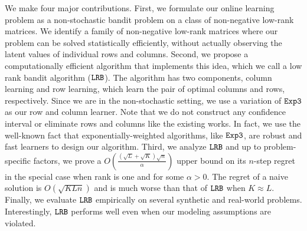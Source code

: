 

We make four major contributions. First, we formulate our online learning problem as a non-stochastic bandit problem on a class of non-negative low-rank matrices. We identify a family of non-negative low-rank matrices where our problem can be solved statistically efficiently, without actually observing the latent values of individual rows and columns. Second, we propose a computationally efficient algorithm that implements this idea, which we call a low rank bandit algorithm (${\tt LRB}$). The algorithm has two components, column learning and row learning, which learn the pair of optimal columns and rows, respectively. Since we are in the non-stochastic setting, we use a variation of ${\tt Exp3}$ \citep{auer2002nonstochastic} as our row and column learner. Note that we do not construct any confidence interval or eliminate rows and columns like the existing works. In fact, we use the well-known fact that exponentially-weighted algorithms, like ${\tt Exp3}$, are robust and fast learners to design our algorithm. Third, we analyze ${\tt LRB}$ and up to problem-specific factors, we prove a $O\left(\frac{\left(\sqrt{L } + \sqrt{K }\right)\sqrt{n}}{\alpha}\right)$ upper bound on its $n$-step regret in the special case when rank is one and for some $\alpha > 0$. The regret of a naive solution is $O(\sqrt{K L n})$ and is much worse than that of ${\tt LRB}$ when $K \approx L$. Finally, we evaluate ${\tt LRB}$ empirically on several synthetic and real-world problems. Interestingly, ${\tt LRB}$ performs well even when our modeling assumptions are violated.

